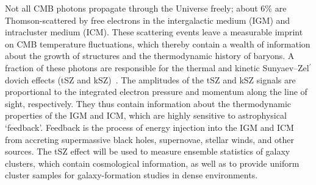 \documentclass[PICOReport.tex]{subfiles}
\begin{document}
\vspace{0.1in}
 \hspace{0.1in} \label{sz}
Not all CMB photons propagate through the Universe freely; about 6\% are Thomson-scattered by free electrons in the intergalactic medium (IGM) and intracluster medium (ICM). These scattering events leave a measurable imprint on CMB temperature fluctuations, which thereby contain a wealth of information about the growth of structures and the thermodynamic history of baryons. A fraction of these photons are responsible for the thermal and kinetic Sunyaev--Zel$^{\prime}$dovich effects (tSZ and kSZ)~\citep{zeldovich69,SZ1972}. 
The amplitudes of the tSZ and kSZ signals are proportional to the integrated electron pressure and momentum along the line of sight, respectively.  They thus contain information about the thermodynamic properties of the IGM and ICM, which are highly sensitive to astrophysical \lq{feedback}\rq. Feedback is the process of energy injection into the IGM and ICM from accreting supermassive black holes, supernovae, stellar winds, and other sources.
The tSZ effect will be used to measure ensemble statistics of galaxy clusters, which contain cosmological information, as well as to provide uniform cluster samples for galaxy-formation studies in dense environments. 
\end{document}
